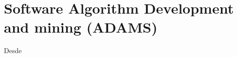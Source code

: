    \newpage

\section{Software Algorithm Development and mining (ADAMS)}
Desde

    
      
        
            
            
            

        
    
    
